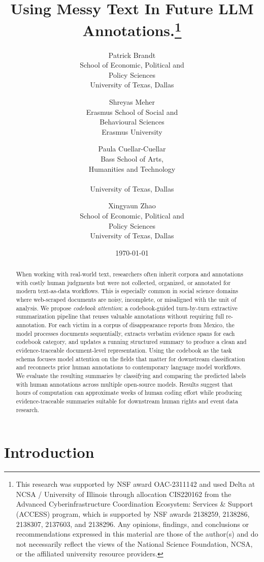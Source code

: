 \documentclass{article}
\title{Using Messy Text In  Future LLM Annotations.\footnote{This research was supported by NSF award OAC-2311142 and 
used Delta at NCSA / University of Illinois through allocation CIS220162 from the Advanced Cyberinfrastructure Coordination Ecosystem: Services \& Support (ACCESS) program, which is supported by NSF awards 2138259, 2138286, 2138307, 2137603, and 2138296. Any opinions, findings, and conclusions or recommendations expressed
in this material are those of the author(s) and do not necessarily
reflect the views of the National Science Foundation,  NCSA, or the
affiliated university resource providers.}}
\author{Patrick Brandt \\ School of Economic, Political and \\ Policy Sciences \\ University of Texas, Dallas\\ \email{pbrandt@utdallas.edu}
\and Shreyas Meher \\ Erasmus School of Social and\\ Behavioural Sciences\\ Erasmus University \\
\email{meher@essb.eur.nl}
\and Paula Cuellar-Cuellar \\ Bass School of Arts, \\ Humanities and Technology \\ \email{email}  \\ University of Texas, Dallas\\
\and Xingyaun Zhao \\ School of Economic, Political and \\ Policy Sciences \\ University of Texas, Dallas\\ \email{email}}
\date{\today}
\begin{document}
\maketitle
\begin{abstract}



When working with real-world text, researchers often inherit corpora and annotations with costly human judgments but were not collected, organized, or annotated for modern text-as-data workflows. This is especially common in social science domains where web-scraped documents are noisy, incomplete, or misaligned with the unit of analysis.
We propose \emph{codebook attention}: a codebook-guided turn-by-turn extractive summarization pipeline that reuses valuable annotations without requiring full re-annotation. For each victim in a corpus of disappearance reports from Mexico, the model processes documents sequentially, extracts verbatim evidence spans for each codebook category, and updates a running structured summary to produce a clean and evidence-traceable document-level representation. Using the codebook as the task schema focuses model attention on the fields that matter for downstream classification and reconnects prior human annotations to contemporary language model workflows. We evaluate the resulting summaries by classifying and comparing the predicted labels with human annotations across multiple open-source models. %
Results suggest that hours of computation can approximate weeks of human coding effort while producing evidence-traceable summaries suitable for downstream human rights and event data research.
\end{abstract}

\newpage

\section{Introduction}\label{introduction}
\end{document}

